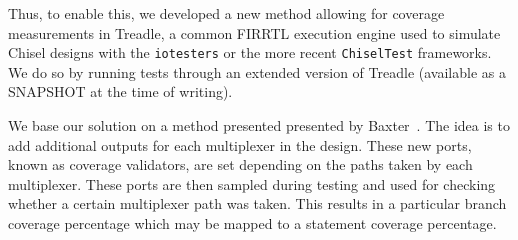 \documentclass[conference]{IEEEtran}
\begin{document}
Thus, to enable this, we developed a new method allowing for coverage measurements in Treadle, a common FIRRTL execution engine used to simulate Chisel designs with the \texttt{iotesters} or the more recent \texttt{ChiselTest} frameworks. We do so by running tests through an extended version of Treadle (available as a SNAPSHOT at the time of writing).%

We base our solution on a method presented presented by Baxter~\cite{branch-cov-made-easy:2002}. The idea is to add additional outputs for each multiplexer in the design. These new ports, known as coverage validators, are set depending on the paths taken by each multiplexer. These ports are then sampled during testing and used for checking whether a certain multiplexer path was taken. This results in a particular branch coverage percentage which may be mapped to a statement coverage percentage.%
\end{document}
